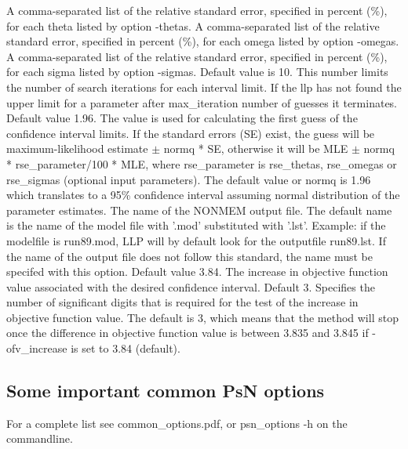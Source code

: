 \begin{optionlist}
A comma-separated list of the relative standard error, specified in percent (\%), for each theta listed by option -thetas. 
\nextopt
{}
A comma-separated list of the relative standard error, specified in percent (\%), for each omega listed by option -omegas. 
\nextopt
{}
A comma-separated list of the relative standard error, specified in percent (\%), for each sigma listed by option -sigmas. 
\nextopt
{}
Default value is 10. This number limits the number of search iterations for each interval limit. If the llp has not found the upper limit for a parameter after max\_iteration number of guesses it terminates. 
\nextopt
{}
Default value 1.96. The value is used for calculating the first guess of the confidence interval limits. If the standard errors (SE) exist, the guess will be maximum-likelihood estimate $\pm$ normq * SE, otherwise it will be MLE $\pm$ normq * rse\_parameter/100 * MLE, where rse\_parameter is rse\_thetas, rse\_omegas or rse\_sigmas (optional input parameters). The default value or normq is 1.96 which translates to a 95\% confidence interval assuming normal distribution of the parameter estimates. 
\nextopt
{}
The name of the NONMEM output file. The default name is the name of the model file with '.mod' substituted with '.lst'. Example: if the modelfile is run89.mod, LLP will by default look for the outputfile run89.lst. If the name of the output file does not follow this standard, the name must be specifed with this option. 
\nextopt
{}
Default value 3.84. The increase in objective function value associated with the desired confidence interval. 
\nextopt
{}
Default 3. Specifies the number of significant digits that is required for the test of the increase in objective function value. The default is 3, which means that the method will stop once the difference in objective function value is between 3.835 and 3.845 if -ofv\_increase is set to 3.84 (default). 
\nextopt
\end{optionlist}

\subsection{Some important common PsN options}
For a complete list see common\_options.pdf, 
or psn\_options -h on the commandline.


